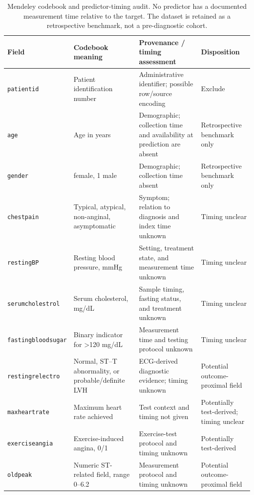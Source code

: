 \documentclass[journal]{IEEEtran}
\begin{document}
\begin{table}[t]
\centering
\caption{Mendeley codebook and predictor-timing audit. No predictor has a
documented measurement time relative to the target. The dataset is retained as
a retrospective benchmark, not a pre-diagnostic cohort.}
\label{tab:mendeley-provenance}
\scriptsize
\setlength{\tabcolsep}{3pt}
\begin{tabular}{@{}>{\raggedright\arraybackslash}p{2.0cm}>{\raggedright\arraybackslash}p{4.8cm}>{\raggedright\arraybackslash}p{6.1cm}>{\raggedright\arraybackslash}p{2.9cm}@{}}
\toprule
Field & Codebook meaning & Provenance / timing assessment & Disposition \\
\midrule
\texttt{patient\allowbreak id} & Patient identification number & Administrative identifier; possible row/source encoding & Exclude \\
\texttt{age} & Age in years & Demographic; collection time and availability at prediction are absent & Retrospective benchmark only \\
\texttt{gender} & 0 female, 1 male & Demographic; collection time absent & Retrospective benchmark only \\
\texttt{chest\allowbreak pain} & Typical, atypical, non-anginal, asymptomatic & Symptom; relation to diagnosis and index time unknown & Timing unclear \\
\texttt{restingBP} & Resting blood pressure, mmHg & Setting, treatment state, and measurement time unknown & Timing unclear \\
\texttt{serum\allowbreak cholestrol} & Serum cholesterol, mg/dL & Sample timing, fasting status, and treatment unknown & Timing unclear \\
\texttt{fasting\allowbreak blood\allowbreak sugar} & Binary indicator for >120 mg/dL & Measurement time and testing protocol unknown & Timing unclear \\
\texttt{resting\allowbreak relectro} & Normal, ST--T abnormality, or probable/definite LVH & ECG-derived diagnostic evidence; timing unknown & Potential outcome-proximal field \\
\texttt{max\allowbreak heartrate} & Maximum heart rate achieved & Test context and timing not given & Potentially test-derived; timing unclear \\
\texttt{exercise\allowbreak angia} & Exercise-induced angina, 0/1 & Exercise-test protocol and timing unknown & Potentially test-derived \\
\texttt{oldpeak} & Numeric ST-related field, range 0--6.2 & Measurement protocol and timing unknown & Potential outcome-proximal field \\

\end{tabular}
\end{table}
\end{document}
